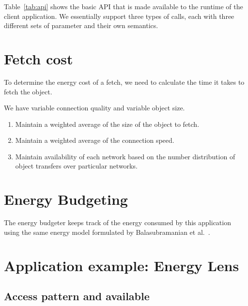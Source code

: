 Table~\ref{tab:api} shows the basic API that is made available to the runtime of the client application.  We essentially support three
types of calls, each with three different sets of parameter and their own semantics.

\section{Fetch cost}
To determine the energy cost of a fetch, we need to calculate the time it takes to fetch the object.  

We have variable connection quality and variable object size.

\begin{enumerate}
\item Maintain a weighted average of the size of the object to fetch.
\item Maintain a weighted average of the connection speed.
\item Maintain availability of each network based on the number distribution of object transfers over particular networks.	
\end{enumerate}

\section{Energy Budgeting}
The energy budgeter keeps track of the energy consumed by this application using the same energy model formulated by 
Balasubramanian et al.~\cite{tailender}.


\section{Application example: Energy Lens}

\subsection {Access pattern and available}



